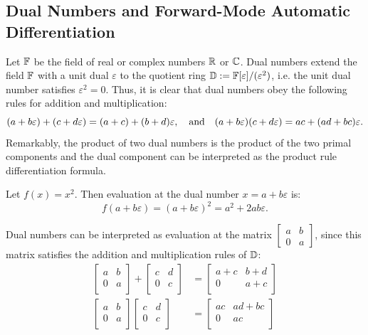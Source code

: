 \subsection{Dual Numbers and Forward-Mode Automatic Differentiation}

Let $\mathbb{F}$ be the field of real or complex numbers $\mathbb{R}$ or $\mathbb{C}$. Dual numbers extend the field $\mathbb{F}$ with a unit dual $\varepsilon$ to the quotient ring $\mathbb{D}:= \mathbb{F}[\varepsilon]/(\varepsilon^2)$, i.e. the unit dual number satisfies $\varepsilon^2=0$. Thus, it is clear that dual numbers obey the following rules for addition and multiplication:
\[
(a+b\varepsilon) + (c+d\varepsilon) = (a+c) + (b+d)\varepsilon,\quad{\rm and}\quad (a+b\varepsilon)(c+d\varepsilon) = ac + (ad+bc)\varepsilon.
\]
Remarkably, the product of two dual numbers is the product of the two primal components and the dual component can be interpreted as the product rule differentiation formula.
\begin{example}
Let $f(x) = x^2$. Then evaluation at the dual number $x=a+b\varepsilon$ is:
\[
f(a+b\varepsilon) = (a+b\varepsilon)^2 = a^2 + 2ab\varepsilon.
\]
\end{example}
Dual numbers can be interpreted as evaluation at the matrix $\begin{bmatrix}a & b\\0 & a\end{bmatrix}$, since this matrix satisfies the addition and multiplication rules of $\mathbb{D}$:
\begin{align*}
\begin{bmatrix}
a & b\\
0 & a\\
\end{bmatrix} + \begin{bmatrix}
c & d\\
0 & c\\
\end{bmatrix}
& =
\begin{bmatrix}
a+c & b+d\\
0 & a+c\\
\end{bmatrix}\\
\begin{bmatrix}
a & b\\
0 & a\\
\end{bmatrix}
\begin{bmatrix}
c & d\\
0 & c\\
\end{bmatrix}
& =
\begin{bmatrix}
ac & ad+bc\\
0 & ac\\
\end{bmatrix}
\end{align*}
